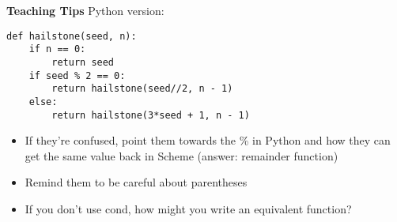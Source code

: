 \begin{blocksection}
\begin{guide}
\textbf{Teaching Tips}
\newline
Python version:
\begin{lstlisting}
def hailstone(seed, n):
    if n == 0:
        return seed
    if seed % 2 == 0:
        return hailstone(seed//2, n - 1)
    else:
        return hailstone(3*seed + 1, n - 1)
\end{lstlisting}
\begin{itemize}
    \item If they’re confused, point them towards the \% in Python and how they can get the same value back in Scheme (answer: remainder function) 
    \item Remind them to be careful about parentheses
    \item If you don’t use cond, how might you write an equivalent function? 
\end{itemize}
\end{guide}
\end{blocksection}
